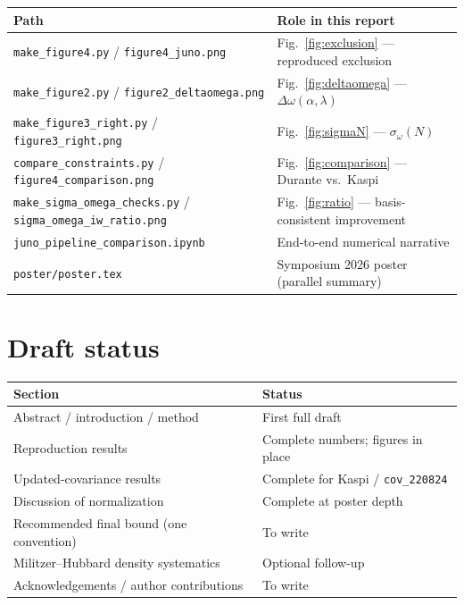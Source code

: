\documentclass[11pt,a4paper]{article}
\begin{document}
\begin{center}
\begin{tabular}{@{}ll@{}}
\toprule
Path & Role in this report \\
\midrule
\texttt{make\_figure4.py} / \texttt{figure4\_juno.png}
  & Fig.~\ref{fig:exclusion} --- reproduced exclusion \\
\texttt{make\_figure2.py} / \texttt{figure2\_deltaomega.png}
  & Fig.~\ref{fig:deltaomega} --- \(\Delta\omega(\alpha,\lambda)\) \\
\texttt{make\_figure3\_right.py} / \texttt{figure3\_right.png}
  & Fig.~\ref{fig:sigmaN} --- \(\sigma_\omega(N)\) \\
\texttt{compare\_constraints.py} / \texttt{figure4\_comparison.png}
  & Fig.~\ref{fig:comparison} --- Durante vs.\ Kaspi \\
\texttt{make\_sigma\_omega\_checks.py} / \texttt{sigma\_omega\_iw\_ratio.png}
  & Fig.~\ref{fig:ratio} --- basis-consistent improvement \\
\texttt{juno\_pipeline\_comparison.ipynb}
  & End-to-end numerical narrative \\
\texttt{poster/poster.tex}
  & Symposium 2026 poster (parallel summary) \\
\bottomrule
\end{tabular}
\end{center}

\section{Draft status}

\begin{center}
\begin{tabular}{@{}ll@{}}
\toprule
Section & Status \\
\midrule
Abstract / introduction / method & First full draft \\
Reproduction results & Complete numbers; figures in place \\
Updated-covariance results & Complete for Kaspi / \texttt{cov\_220824} \\
Discussion of normalization & Complete at poster depth \\
Recommended final bound (one convention) & To write \\
Militzer--Hubbard density systematics & Optional follow-up \\
Acknowledgements / author contributions & To write \\
\bottomrule
\end{tabular}
\end{center}
\end{document}
